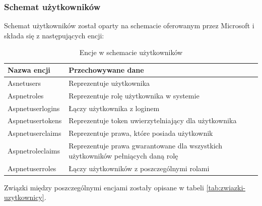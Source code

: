 \documentclass[11pt, a4]{article} %
\begin{document}
\subsubsection{Schemat użytkowników}

Schemat użytkowników został oparty na schemacie oferowanym przez Microsoft 
\parencite{vickers:2021an} i składa się z następujących encji:

\begin{table}[!ht]
    \caption{Encje w schemacie użytkowników}
    \label{tab:encje-uzytkownicy}
    \begin{tabularx}{1\textwidth} { 
        | >{\raggedright\arraybackslash}X        
        | >{\raggedleft\arraybackslash}X | }
        \hline
       Nazwa encji & Przechowywane dane \\
       \hline
       Asnetusers & Reprezentuje użytkownika \\
       \hline
       Aspnetroles & Reprezentuje rolę użytkownika w systemie \\
       \hline
       Aspnetuserlogins & Łączy użytkownika z loginem \\
       \hline
       Aspnetusertokens & Reprezentuje token uwierzytelniający dla użytkownika \\
       \hline
       Aspnetuserclaims & Reprezentuje prawa, które posiada użytkownik \\
       \hline
       Aspnetroleclaims & Reprezentuje prawa gwarantowane dla wszystkich użytkowników
       pełniących daną rolę \\
       \hline
       Aspnetuserroles & Łączy użytkowników z poszczególnymi rolami \\
       \hline
    \end{tabularx}
\end{table}

Związki między poszczególnymi encjami zostały opisane w tabeli \ref{tab:zwiazki-uzytkownicy}.
\end{document}
